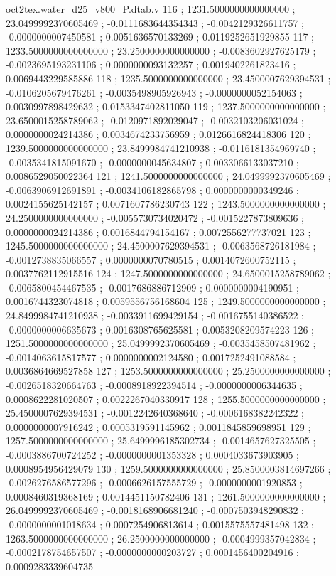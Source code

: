 \begin{filecontents}[overwrite]{oct2tex.water_d25_v800_P.dtab.v}
116 ; 1231.5000000000000000 ; 23.0499992370605469 ; -0.0111683644354343 ; -0.0042129326611757 ; -0.0000000007450581 ; 0.0051636570133269 ; 0.0119252651929855
117 ; 1233.5000000000000000 ; 23.2500000000000000 ; -0.0083602927625179 ; -0.0023695193231106 ; 0.0000000093132257 ; 0.0019402261823416 ; 0.0069443229585886
118 ; 1235.5000000000000000 ; 23.4500007629394531 ; -0.0106205679476261 ; -0.0035498905926943 ; -0.0000000052154063 ; 0.0030997898429632 ; 0.0153347402811050
119 ; 1237.5000000000000000 ; 23.6500015258789062 ; -0.0120971892029047 ; -0.0032103206031024 ; 0.0000000024214386 ; 0.0034674233756959 ; 0.0126616824418306
120 ; 1239.5000000000000000 ; 23.8499984741210938 ; -0.0116181354969740 ; -0.0035341815091670 ; -0.0000000045634807 ; 0.0033066133037210 ; 0.0086529050022364
121 ; 1241.5000000000000000 ; 24.0499992370605469 ; -0.0063906912691891 ; -0.0034106182865798 ; 0.0000000000349246 ; 0.0024155625142157 ; 0.0071607786230743
122 ; 1243.5000000000000000 ; 24.2500000000000000 ; -0.0055730734020472 ; -0.0015227873809636 ; 0.0000000024214386 ; 0.0016844794154167 ; 0.0072556277737021
123 ; 1245.5000000000000000 ; 24.4500007629394531 ; -0.0063568726181984 ; -0.0012738835066557 ; 0.0000000070780515 ; 0.0014072600752115 ; 0.0037762112915516
124 ; 1247.5000000000000000 ; 24.6500015258789062 ; -0.0065800454467535 ; -0.0017686886712909 ; 0.0000000004190951 ; 0.0016744323074818 ; 0.0059556756168604
125 ; 1249.5000000000000000 ; 24.8499984741210938 ; -0.0033911699429154 ; -0.0016755140386522 ; -0.0000000006635673 ; 0.0016308765625581 ; 0.0053208209574223
126 ; 1251.5000000000000000 ; 25.0499992370605469 ; -0.0035458507481962 ; -0.0014063615817577 ; 0.0000000002124580 ; 0.0017252491088584 ; 0.0036864669527858
127 ; 1253.5000000000000000 ; 25.2500000000000000 ; -0.0026518320664763 ; -0.0008918922394514 ; -0.0000000006344635 ; 0.0008622281020507 ; 0.0022267040330917
128 ; 1255.5000000000000000 ; 25.4500007629394531 ; -0.0012242640368640 ; -0.0006168382242322 ; 0.0000000007916242 ; 0.0005319591145962 ; 0.0011845859698951
129 ; 1257.5000000000000000 ; 25.6499996185302734 ; -0.0014657627325505 ; -0.0003886700724252 ; -0.0000000001353328 ; 0.0004033673903905 ; 0.0008954956429079
130 ; 1259.5000000000000000 ; 25.8500003814697266 ; -0.0026276586577296 ; -0.0006626157555729 ; -0.0000000001920853 ; 0.0008460319368169 ; 0.0014451150782406
131 ; 1261.5000000000000000 ; 26.0499992370605469 ; -0.0018168906681240 ; -0.0007503948290832 ; -0.0000000001018634 ; 0.0007254906813614 ; 0.0015575557481498
132 ; 1263.5000000000000000 ; 26.2500000000000000 ; -0.0004999357042834 ; -0.0002178754657507 ; -0.0000000000203727 ; 0.0001456400204916 ; 0.0009283339604735

\end{filecontents}
